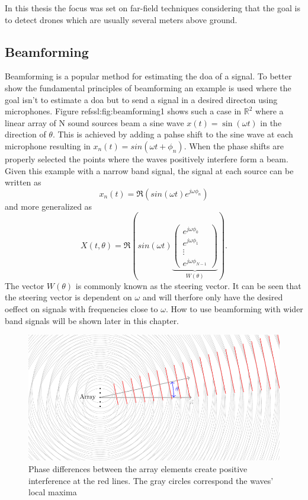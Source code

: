 In this thesis the focus was set on far-field techniques considering that the
goal is to detect drones which are usually several meters above ground.

\subsection{Beamforming}
Beamforming is a popular method for estimating the \acrshort{doa} of a signal.
To better show the fundamental principles of beamforming an example is used
where the goal isn't to estimate a \acrshort{doa} but to send a signal
in a desired directon using microphones.
Figure ref{ssl:fig:beamforming1} shows such a case in $\mathbb{R}^2$
where a linear array of N sound sources beam a sine wave $x(t) = \sin(\omega t)$ 
in the direction of $\theta$.
This is achieved by adding a pahse shift to the sine wave
at each microphone resulting in $x_n(t) = sin(\omega t + \phi_n)$.
When the phase shifts are properly selected the points where the waves positively
interfere form a beam.
Given this example with a narrow band signal, the signal at each source
can be written as
\begin{equation}
  x_n(t) = \Re(sin(\omega t) e^{j\omega \phi_n})
\end{equation}
and more generalized as 
\begin{equation}
  \label{ssl:eq:beamSteerOut}
  X(t, \theta) = 
  \Re\left(
    sin(\omega t)
    \underbrace{\begin{pmatrix} e^{j\omega \phi_0} \\ 
                    e^{j\omega \phi_1} \\
                    \vdots \\ 
                    e^{j\omega \phi_{N-1}} 
      \end{pmatrix}}_{W(\theta)}
  \right).
\end{equation}
The vector $W(\theta)$ is commonly known as the steering vector.
It can be seen that the steering vector is dependent on $\omega$ and 
will therfore only have the desired oeffect on signals with frequencies 
close to $\omega$.
How to use beamforming with wider band signals will be shown later in this chapter.
\begin{figure}
  \centering
  \includegraphics[]{beamforming_1.pdf}
  \caption{Phase differences between the array elements create positive interference at the red lines.
  The gray circles correspond the waves' local maxima}
  \label{ssl:fig:beamforming1}
\end{figure}


